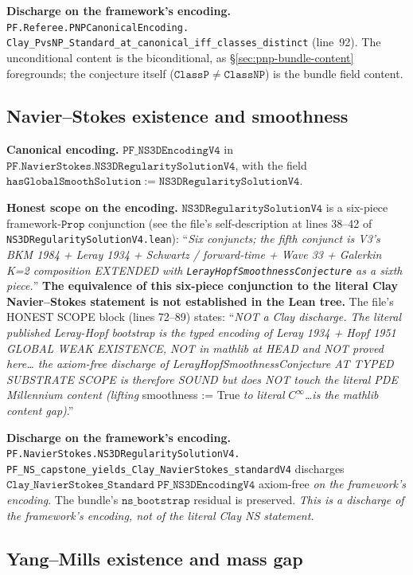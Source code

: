 \documentclass[11pt,a4paper]{article}
\theoremstyle{plain}
\theoremstyle{definition}
\begin{document}
\textbf{Discharge on the framework's encoding.}
\texttt{PF.Referee.PNPCanonicalEncoding.\\
Clay\_PvsNP\_Standard\_at\_canonical\_iff\_classes\_distinct}
(line~92). The unconditional content is the biconditional, as
\S\ref{sec:pnp-bundle-content} foregrounds; the conjecture itself
($\mathtt{ClassP} \neq \mathtt{ClassNP}$) is the bundle field
content.

\subsection{Navier--Stokes existence and smoothness}
\label{sec:ns}

\textbf{Canonical encoding.}
$\mathtt{PF\_NS3DEncodingV4}$ in
$\mathtt{PF.NavierStokes.NS3DRegularitySolutionV4}$, with the
field
$\mathtt{hasGlobalSmoothSolution := NS3DRegularitySolutionV4}$.

\textbf{Honest scope on the encoding.}
$\mathtt{NS3DRegularitySolutionV4}$ is a six-piece
framework-$\mathtt{Prop}$ conjunction (see the file's
self-description at lines 38--42 of
\texttt{NS3DRegularitySolutionV4.lean}): ``\emph{Six conjuncts;
the fifth conjunct is V3's BKM 1984 + Leray 1934 + Schwartz /
forward-time + Wave 33 + Galerkin K=2 composition EXTENDED with
\texttt{LerayHopfSmoothnessConjecture} as a sixth piece.}''
\textbf{The equivalence of this six-piece conjunction to the
literal Clay Navier--Stokes statement is not established in the
Lean tree.} The file's HONEST SCOPE block (lines 72--89) states:
``\emph{NOT a Clay discharge. The literal published Leray-Hopf
bootstrap is the typed encoding of Leray 1934 + Hopf 1951 GLOBAL
WEAK EXISTENCE, NOT in mathlib at HEAD and NOT proved here\ldots
the axiom-free discharge of LerayHopfSmoothnessConjecture AT
TYPED SUBSTRATE SCOPE is therefore SOUND but does NOT touch the
literal PDE Millennium content (lifting} smoothness := True
\emph{to literal} $C^{\infty}$\emph{\ldots is the mathlib content
gap)}.''

\textbf{Discharge on the framework's encoding.}
\texttt{PF.NavierStokes.NS3DRegularitySolutionV4.\\
PF\_NS\_capstone\_yields\_Clay\_NavierStokes\_standardV4}
discharges $\mathtt{Clay\_NavierStokes\_Standard\;
PF\_NS3DEncodingV4}$ axiom-free \emph{on the framework's encoding}.
The bundle's $\mathtt{ns\_bootstrap}$ residual is preserved.
\emph{This is a discharge of the framework's encoding, not of the
literal Clay NS statement.}

\subsection{Yang--Mills existence and mass gap}
\label{sec:ym}
\end{document}
